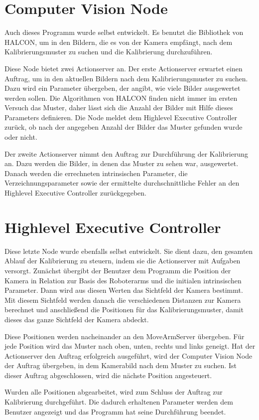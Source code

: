 \section{Computer Vision Node} %
\label{sec:caltab_detector_node}
Auch dieses Programm wurde selbst entwickelt. Es benutzt die Bibliothek von HALCON, um in den Bildern, die es von der Kamera empfängt, nach dem Kalibrierungsmuster zu suchen und die Kalibrierung durchzuführen.

Diese Node bietet zwei Actionserver an. Der erste Actionserver erwartet einen Auftrag, um in den aktuellen Bildern nach dem Kalibrierungsmuster zu suchen. Dazu wird ein Parameter übergeben, der angibt, wie viele Bilder ausgewertet werden sollen. Die Algorithmen von HALCON finden nicht immer im ersten Versuch das Muster, daher lässt sich die Anzahl der Bilder mit Hilfe dieses Parameters definieren. Die Node meldet dem Highlevel Executive Controller zurück, ob nach der angegeben Anzahl der Bilder das Muster gefunden wurde oder nicht.

Der zweite Actionserver nimmt den Auftrag zur Durchführung der Kalibrierung an. Dazu werden die Bilder, in denen das Muster zu sehen war, ausgewertet. Danach werden die errechneten intrinsischen Parameter, die Verzeichnungsparameter sowie der ermittelte durchschnittliche Fehler an den Highlevel Executive Controller zurückgegeben.

\section{Highlevel Executive Controller} %
\label{sec:calibrationcontroller}
Diese letzte Node wurde ebenfalls selbst entwickelt. Sie dient dazu, den gesamten Ablauf der Kalibrierung zu steuern, indem sie die Actionserver mit Aufgaben versorgt. Zunächst übergibt der Benutzer dem Programm die Position der Kamera in Relation zur Basis des Roboterarms und die initialen intrinsischen Parameter. Dann wird aus diesen Werten das Sichtfeld der Kamera bestimmt. Mit diesem Sichtfeld werden danach die verschiedenen Distanzen zur Kamera berechnet und anschließend die Positionen für das Kalibrierungsmuster, damit dieses das ganze Sichtfeld der Kamera abdeckt.

Diese Positionen werden nacheinander an den MoveArmServer übergeben. Für jede Position wird das Muster nach oben, unten, rechts und links geneigt. Hat der Actionserver den Auftrag erfolgreich ausgeführt, wird der Computer Vision Node der Auftrag übergeben, in dem Kamerabild nach dem Muster zu suchen. Ist dieser Auftrag abgeschlossen, wird die nächste Position angesteuert.

Wurden alle Positionen abgearbeitet, wird zum Schluss der Auftrag zur Kalibrierung durchgeführt. Die dadurch erhaltenen Parameter werden dem Benutzer angezeigt und das Programm hat seine Durchführung beendet.